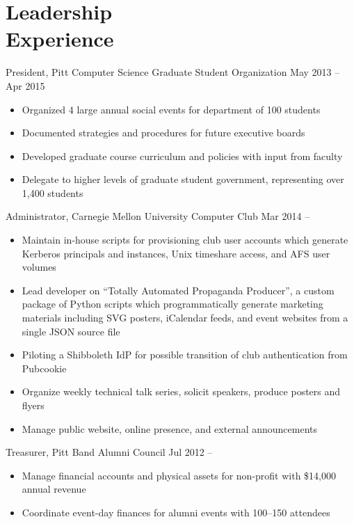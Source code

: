 \documentclass[11pt]{article}
\newcommand{\textdb}[1]{\fontseries{db}\selectfont#1\normalfont}
\newcommand{\present}{\phantom{Xxx 20XX}}
\begin{document}
\section{Leadership\\ Experience}

\textdb{
President, Pitt Computer Science Graduate Student Organization
	\hfill May 2013 -- Apr 2015
}
\begin{itemize}
	\item Organized 4 large annual social events for department of 100 students
	\item Documented strategies and procedures for future executive boards
	\item Developed graduate course curriculum and policies with input from faculty
	\item Delegate to higher levels of graduate student government,
		representing over 1,400 students
\end{itemize}

\textdb{
Administrator, Carnegie Mellon University Computer Club
	\hfill Mar 2014 -- \present
}
\begin{itemize}
	\item Maintain in-house scripts for provisioning club user accounts
		which generate Kerberos principals and instances,
		Unix timeshare access, and AFS user volumes
	\item Lead developer on ``Totally Automated Propaganda Producer'',
		a custom package of Python scripts
		which programmatically generate marketing materials
		including SVG posters, iCalendar feeds, and event websites
		from a single JSON source file
	\item Piloting a Shibboleth IdP for possible transition
		of club authentication from Pubcookie
	\item Organize weekly technical talk series, solicit speakers, produce posters and flyers
	\item Manage public website, online presence, and external announcements
\end{itemize}

\textdb{
Treasurer, Pitt Band Alumni Council
	\hfill Jul 2012 -- \present
}
\begin{itemize}
	\item Manage financial accounts and physical assets
		for non-profit with \$14,000 annual revenue
	\item Coordinate event-day finances for alumni events with 100--150 attendees
\end{itemize}
\end{document}

